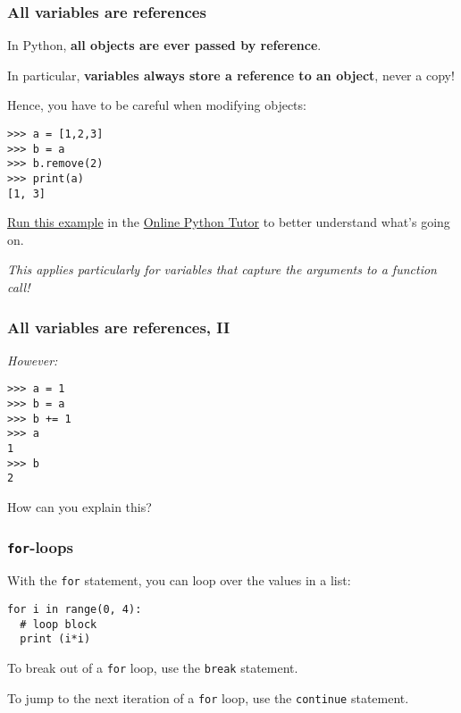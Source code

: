 \documentclass[english,serif,mathserif,xcolor=pdftex,dvipsnames,table]{beamer}
\begin{document}



\begin{frame}[fragile]
  \frametitle{All variables are references}

  In Python, \textbf{all objects are ever passed by reference}.

  \+
  In particular, \textbf{variables always store a reference to an
    object}, never a copy!

  \+
  Hence, you have to be careful when modifying objects:
\begin{lstlisting}
>>> a = [1,2,3]
>>> b = a
>>> b.remove(2)
>>> print(a)
[1, 3]
\end{lstlisting}

   \+
   \href{http://tinyurl.com/cq3tcab}{Run this example} in the
   \href{http://pythontutor.com/}{Online Python Tutor} to better
   understand what's going on.

   \+
   {\small \em
     This applies particularly for variables that capture the arguments
     to a function call!}

\end{frame}


\begin{frame}[fragile]
  \frametitle{All variables are references, II}
  \emph{However:}
\begin{lstlisting}
>>> a = 1
>>> b = a
>>> b += 1
>>> a
1
>>> b
2
\end{lstlisting}
  \begin{question}
    How can you explain this?

  \end{question}
\end{frame}


\begin{frame}[fragile]
  \frametitle{\texttt{for}-loops}
    With the  \texttt{for} statement, you can loop over the values in
    a list:
\begin{lstlisting}
for i in range(0, 4):
  # loop block
  print (i*i)
\end{lstlisting}

  \+
  To break out of a \texttt{for} loop, use the \texttt{break}
  statement.

  \+
  To jump to the next iteration of a \texttt{for} loop, use the
  \texttt{continue} statement.
\end{frame}
\end{document}
